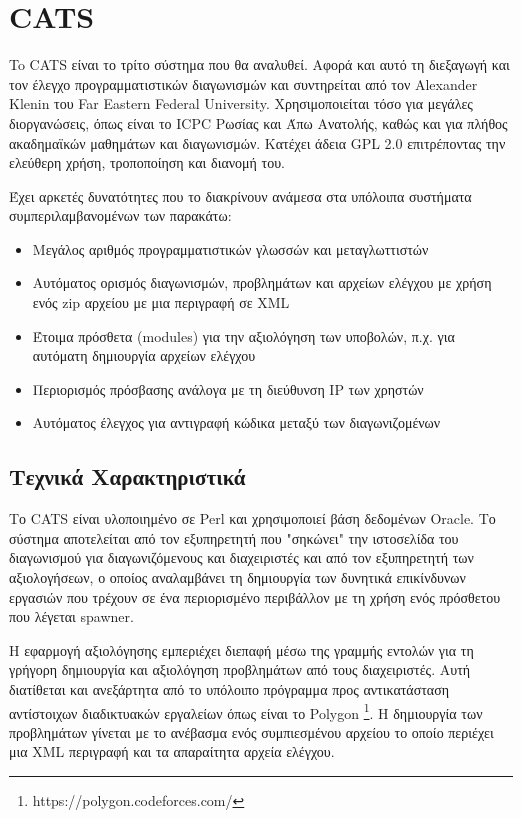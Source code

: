 \documentclass[diploma]{softlab-thesis}
\begin{document}
\FloatBarrier

\section{CATS}

To CATS είναι το τρίτο σύστημα που θα αναλυθεί. Αφορά και αυτό τη διεξαγωγή και
τον έλεγχο προγραμματιστικών διαγωνισμών και συντηρείται από τον Alexander Klenin
του Far Eastern Federal University. Χρησιμοποιείται τόσο για μεγάλες διοργανώσεις,
όπως είναι το ICPC Ρωσίας και Άπω Ανατολής, καθώς και για πλήθος ακαδημαϊκών
μαθημάτων και διαγωνισμών. Κατέχει άδεια GPL 2.0 επιτρέποντας την ελεύθερη
χρήση, τροποποίηση και διανομή του.

\bigskip

Έχει αρκετές δυνατότητες που το διακρίνουν ανάμεσα στα υπόλοιπα συστήματα
συμπεριλαμβανομένων των παρακάτω:

\begin{itemize}
    \item Μεγάλος αριθμός προγραμματιστικών γλωσσών και μεταγλωττιστών
    \item Αυτόματος ορισμός διαγωνισμών, προβλημάτων και αρχείων ελέγχου με χρήση
      ενός zip αρχείου με μια περιγραφή σε XML
    \item Έτοιμα πρόσθετα (modules) για την αξιολόγηση των υποβολών, π.χ. για
      αυτόματη δημιουργία αρχείων ελέγχου
    \item Περιορισμός πρόσβασης ανάλογα με τη διεύθυνση IP των χρηστών
    \item Αυτόματος έλεγχος για αντιγραφή κώδικα μεταξύ των διαγωνιζομένων
\end{itemize}

\subsection{Τεχνικά Χαρακτηριστικά}

Το CATS είναι υλοποιημένο σε Perl και χρησιμοποιεί βάση δεδομένων Oracle. Το
σύστημα αποτελείται από τον εξυπηρετητή που "σηκώνει" την ιστοσελίδα του
διαγωνισμού για διαγωνιζόμενους και διαχειριστές και από τον εξυπηρετητή των
αξιολογήσεων, ο οποίος αναλαμβάνει τη δημιουργία των δυνητικά επικίνδυνων
εργασιών που τρέχουν σε ένα περιορισμένο περιβάλλον με τη χρήση ενός πρόσθετου
που λέγεται spawner.

\bigskip

Η εφαρμογή αξιολόγησης εμπεριέχει διεπαφή μέσω της γραμμής εντολών για τη
γρήγορη δημιουργία και αξιολόγηση προβλημάτων από τους διαχειριστές. Αυτή
διατίθεται και ανεξάρτητα από το υπόλοιπο πρόγραμμα προς αντικατάσταση
αντίστοιχων διαδικτυακών εργαλείων όπως είναι το Polygon
\footnote{https://polygon.codeforces.com/}. Η δημιουργία των προβλημάτων
γίνεται με το ανέβασμα ενός συμπιεσμένου αρχείου το οποίο περιέχει μια XML
περιγραφή και τα απαραίτητα αρχεία ελέγχου.
\end{document}
